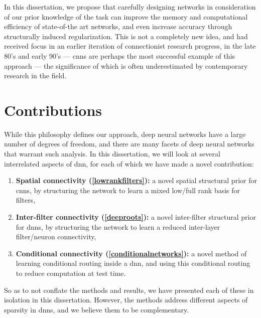 \documentclass[thesis]{subfiles}
\begin{document}
In this dissertation, we propose that carefully designing networks in consideration of our prior knowledge of the task can improve the memory and computational efficiency of state-of-the art networks, and even increase accuracy through structurally induced regularization. This is not a completely new idea, and had received focus in an earlier iteration of connectionist research progress, in the late 80's and early 90's --- \glspl{cnn} are perhaps the most successful example of this approach --- the significance of which is often underestimated by contemporary research in the field.

\section{Contributions}
While this philosophy defines our approach, deep neural networks have a large number of degrees of freedom, and there are many facets of deep neural networks that warrant such analysis. In this dissertation, we will look at several interrelated aspects of \gls{dnn}, for each of which we have made a novel contribution:
\begin{enumerate}[label= (\textbf{\roman*})]
	\item \textbf{Spatial connectivity (\cref{lowrankfilters}):} a novel spatial structural prior for \glspl{cnn}, by structuring the network to learn a mixed low/full rank basis for filters,
	\item \textbf{Inter-filter connectivity (\cref{deeproots}):} a novel inter-filter structural prior for \glspl{dnn}, by structuring the network to learn a reduced inter-layer filter/neuron connectivity,
	\item \textbf{Conditional connectivity (\cref{conditionalnetworks}):} a novel method of learning conditional routing inside a \gls{dnn}, and using this conditional routing to reduce computation at test time.
\end{enumerate}

So as to not conflate the methods and results, we have presented each of these in isolation in this dissertation. However, the methods address different aspects of sparsity in \glspl{dnn}, and we believe them to be complementary.
\end{document}
